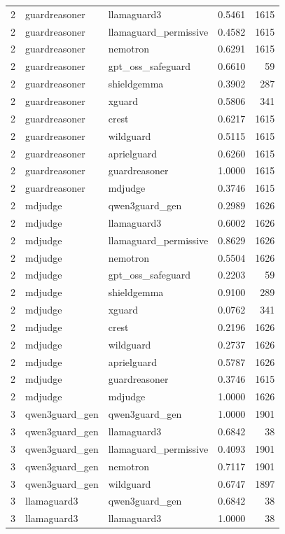 \begin{tabular}{rllrr}
2 & guardreasoner & llamaguard3 & 0.5461 & 1615 \\
2 & guardreasoner & llamaguard\_permissive & 0.4582 & 1615 \\
2 & guardreasoner & nemotron & 0.6291 & 1615 \\
2 & guardreasoner & gpt\_oss\_safeguard & 0.6610 & 59 \\
2 & guardreasoner & shieldgemma & 0.3902 & 287 \\
2 & guardreasoner & xguard & 0.5806 & 341 \\
2 & guardreasoner & crest & 0.6217 & 1615 \\
2 & guardreasoner & wildguard & 0.5115 & 1615 \\
2 & guardreasoner & aprielguard & 0.6260 & 1615 \\
2 & guardreasoner & guardreasoner & 1.0000 & 1615 \\
2 & guardreasoner & mdjudge & 0.3746 & 1615 \\
2 & mdjudge & qwen3guard\_gen & 0.2989 & 1626 \\
2 & mdjudge & llamaguard3 & 0.6002 & 1626 \\
2 & mdjudge & llamaguard\_permissive & 0.8629 & 1626 \\
2 & mdjudge & nemotron & 0.5504 & 1626 \\
2 & mdjudge & gpt\_oss\_safeguard & 0.2203 & 59 \\
2 & mdjudge & shieldgemma & 0.9100 & 289 \\
2 & mdjudge & xguard & 0.0762 & 341 \\
2 & mdjudge & crest & 0.2196 & 1626 \\
2 & mdjudge & wildguard & 0.2737 & 1626 \\
2 & mdjudge & aprielguard & 0.5787 & 1626 \\
2 & mdjudge & guardreasoner & 0.3746 & 1615 \\
2 & mdjudge & mdjudge & 1.0000 & 1626 \\
3 & qwen3guard\_gen & qwen3guard\_gen & 1.0000 & 1901 \\
3 & qwen3guard\_gen & llamaguard3 & 0.6842 & 38 \\
3 & qwen3guard\_gen & llamaguard\_permissive & 0.4093 & 1901 \\
3 & qwen3guard\_gen & nemotron & 0.7117 & 1901 \\
3 & qwen3guard\_gen & wildguard & 0.6747 & 1897 \\
3 & llamaguard3 & qwen3guard\_gen & 0.6842 & 38 \\
3 & llamaguard3 & llamaguard3 & 1.0000 & 38 \\

\end{tabular}
